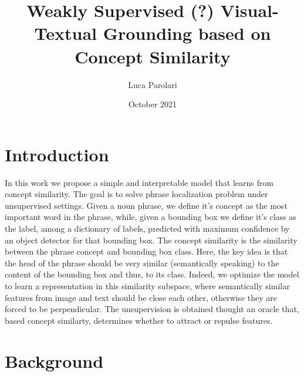 \documentclass{article}
\title{Weakly Supervised (?) Visual-Textual Grounding based on Concept Similarity}
\author{Luca Parolari}
\date{October 2021}
\begin{document}
\maketitle

\section{Introduction}

In this work we propose a simple and interpretable model that learns
from concept similarity. The goal is to solve phrase localization
problem under unsupervised settings. Given a noun phrase, we define
it's concept as the most important word in the phrase, while, given a
bounding box we define it's class as the label, among a dictionary of
labels, predicted with maximum confidence by an object detector for
that bounding box. The concept similarity is the similarity between
the phrase concept and bounding box class. Here, the key idea is that
the head of the phrase should be very similar (semantically speaking)
to the content of the bounding box and thus, to its class. Indeed, we
optimize the model to learn a representation in this similarity
subspace, where semantically similar features from image and text
should be close each other, otherwise they are forced to be
perpendicular. The unsupervision is obtained thought an oracle that,
based concept similarty, determines whether to attract or repulse
features.


\section{Background}
\end{document}
